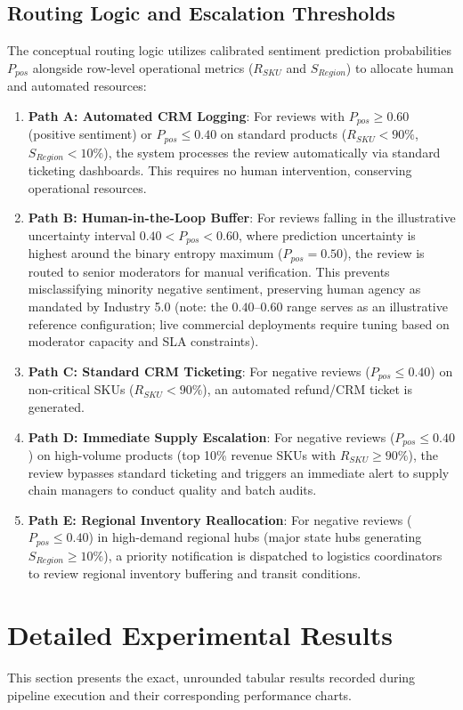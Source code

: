 \documentclass[11pt]{article}
\begin{document}
\subsection{Routing Logic and Escalation Thresholds}
The conceptual routing logic utilizes calibrated sentiment prediction probabilities $P_{pos}$ alongside row-level operational metrics ($R_{SKU}$ and $S_{Region}$) to allocate human and automated resources:
\begin{enumerate}
    \item \textbf{Path A: Automated CRM Logging}: For reviews with $P_{pos} \ge 0.60$ (positive sentiment) or $P_{pos} \le 0.40$ on standard products ($R_{SKU} < 90\%$, $S_{Region} < 10\%$), the system processes the review automatically via standard ticketing dashboards. This requires no human intervention, conserving operational resources.
    \item \textbf{Path B: Human-in-the-Loop Buffer}: For reviews falling in the illustrative uncertainty interval $0.40 < P_{pos} < 0.60$, where prediction uncertainty is highest around the binary entropy maximum ($P_{pos} = 0.50$), the review is routed to senior moderators for manual verification. This prevents misclassifying minority negative sentiment, preserving human agency as mandated by Industry 5.0 (note: the $0.40$--$0.60$ range serves as an illustrative reference configuration; live commercial deployments require tuning based on moderator capacity and SLA constraints).
    \item \textbf{Path C: Standard CRM Ticketing}: For negative reviews ($P_{pos} \le 0.40$) on non-critical SKUs ($R_{SKU} < 90\%$), an automated refund/CRM ticket is generated.
    \item \textbf{Path D: Immediate Supply Escalation}: For negative reviews ($P_{pos} \le 0.40$) on high-volume products (top 10\% revenue SKUs with $R_{SKU} \ge 90\%$), the review bypasses standard ticketing and triggers an immediate alert to supply chain managers to conduct quality and batch audits.
    \item \textbf{Path E: Regional Inventory Reallocation}: For negative reviews ($P_{pos} \le 0.40$) in high-demand regional hubs (major state hubs generating $S_{Region} \ge 10\%$), a priority notification is dispatched to logistics coordinators to review regional inventory buffering and transit conditions.
\end{enumerate}

\newpage
\section{Detailed Experimental Results}
This section presents the exact, unrounded tabular results recorded during pipeline execution and their corresponding performance charts.
\end{document}
